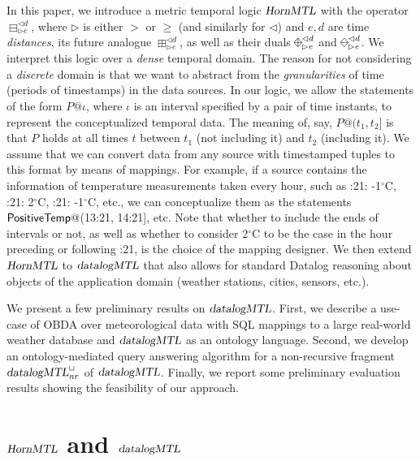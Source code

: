 \documentclass{article}
\newcommand{\diamondplus}{%
  \raisebox{-.15ex}{\begin{tikzpicture}
    \useasboundingbox (-0.7ex, -0.9ex) rectangle (0.7ex, 0.9ex);
    \node (w) at (-0.8ex,0) {};
    \node (e) at (+0.8ex,0) {};
    \node (s) at (0,-.9ex) {};
    \node (n) at (0,+.9ex) {};
    \draw (n.center) -- (e.center) -- (s.center) -- (w.center) -- (n.center);
    \draw (n.center) -- (s.center);
    \draw (e.center) -- (w.center);
  \end{tikzpicture}}}
\newcommand{\diamondminus}{%
  \raisebox{-.15ex}{\begin{tikzpicture}
    \useasboundingbox (-0.7ex, -0.9ex) rectangle (0.7ex, 0.9ex);
    \node (w) at (-0.8ex,0) {};
    \node (e) at (+0.8ex,0) {};
    \node (s) at (0,-.9ex) {};
    \node (n) at (0,+.9ex) {};
    \draw (n.center) -- (e.center) -- (s.center) -- (w.center) -- (n.center);
    \draw (e.center) -- (w.center);
  \end{tikzpicture}}}
\newcommand{\hMTL}{\textsl{HornMTL}}
\newcommand{\dMTL}{\textsl{datalogMTL}}
\begin{document}
In this paper, we introduce a metric temporal logic $\hMTL$ with the operator $\boxminus^{\lhd d}_{\rhd e}$, where $\rhd$ is either $>$ or $\geqslant$ (and similarly for $\lhd$) and $e,d$ are time \emph{distances}, its future analogue $\boxplus^{\lhd d}_{\rhd e}$, as well as their duals $\diamondplus^{\lhd d}_{\rhd e}$ and $\diamondminus^{\lhd d}_{\rhd e}$. We interpret this logic over a \emph{dense} temporal domain. The reason for not considering a \emph{discrete} domain is that we want to abstract from the \emph{granularities} of time (periods of timestamps) in the data sources. In our logic, we allow the statements of the form $P@\iota$, where $\iota$ is an interval specified by a pair of time instants, to represent the conceptualized temporal data. The meaning of, say, $P@(t_1, t_2]$ is that $P$ holds at all times $t$ between $t_1$ (not including it) and $t_2$ (including it). We assume that we can convert data from any source with timestamped tuples to this format by means of mappings. For example, if a source contains the information of temperature measurements taken every hour, such as {:21: -1$^\circ$C}, {:21:  2$^\circ$C}, {:21:  -1$^\circ$C}, etc., we can conceptualize them as the statements {\sf $\sf PositiveTemp@$(13:21, 14:21]}, etc. Note that whether to include the ends of intervals or not, as well as whether to consider 2$^\circ$C to be the case in the hour preceding or following {:21}, is the choice of the mapping designer. We then extend $\hMTL$ to $\dMTL$ that also allows for standard Datalog reasoning about objects of the application domain (weather stations, cities, sensors, etc.).

We present a few preliminary results on $\dMTL$. First, we describe a use-case of OBDA over meteorological data with SQL mappings to a large real-world weather database and $\dMTL$ as an ontology language. Second, we develop an ontology-mediated query answering algorithm for a non-recursive fragment $\dMTL^\Box_{\it nr}$ of $\dMTL$. Finally, we report some preliminary evaluation results showing the feasibility of our approach.

\section{$\hMTL$ and $\dMTL$}
\end{document}
